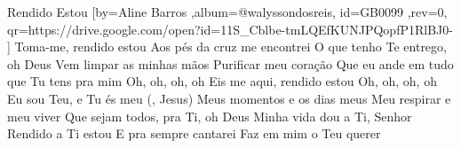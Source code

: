 \beginsong
{Rendido Estou %
}[by={Aline Barros %
},album={@walyssondosreis},
id={GB0099 %
},rev={0}, %
qr={https://drive.google.com/open?id=11S_Cblbe-tmLQEfKUNJPQopfP1RlBJ0- %
}]
\beginverse*
Toma-me, rendido estou
Aos pés da cruz me encontrei
O que tenho Te entrego, oh Deus
\endverse
\beginverse*
Vem limpar as minhas mãos
Purificar meu coração
Que eu ande em tudo que Tu tens pra mim
\endverse
\beginverse*
Oh, oh, oh, oh
Eis me aqui, rendido estou
Oh, oh, oh, oh
Eu sou Teu, e Tu és meu (, Jesus)
\endverse
\beginverse*
Meus momentos e os dias meus
Meu respirar e meu viver
Que sejam todos, pra Ti, oh Deus
\endverse
\beginchorus
Minha vida dou a Ti, Senhor
Rendido a Ti estou
E pra sempre cantarei
Faz em mim o Teu querer
\endchorus

